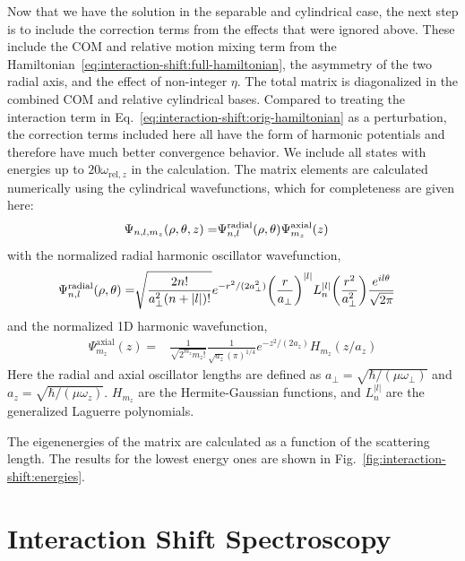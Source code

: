 Now that we have the solution in the separable and cylindrical case,
the next step is to include the correction terms from the effects that were ignored above.
These include the COM and relative motion mixing term
from the Hamiltonian~\ref{eq:interaction-shift:full-hamiltonian},
the asymmetry of the two radial axis, and the effect of non-integer $\eta$.
The total matrix is diagonalized in the combined COM and relative cylindrical bases.
Compared to treating the interaction term in Eq.~\ref{eq:interaction-shift:orig-hamiltonian}
as a perturbation, the correction terms included here all have the form of
harmonic potentials and therefore have much better convergence behavior.
We include all states with energies up to $20 \omega_{\mathrm{rel},z}$ in the calculation.
The matrix elements are calculated numerically using the cylindrical wavefunctions,
which for completeness are given here:
\begin{align*}
  \Psi_{n,l,m_z}{\left({\rho,\theta,z}\right)}=
  &\Psi^{\mathrm{radial}}_{n,l}{\left({\rho, \theta}\right)}\Psi^{\mathrm{axial}}_{m_z}{\left({z}\right)}
\end{align*}
with the normalized radial harmonic oscillator wavefunction,
\begin{align*}
  \Psi^{\mathrm{radial}}_{n,l}{\left({\rho, \theta}\right)}=
  &\sqrt{\frac{2n!}{a_\perp^2 (n+|l|)!}} e^{-r^2/(2 a_\perp^2)} {\left({\frac{r}{a_\perp}}\right)}^{|l|}
    L_n^{|l|}{\left({\frac{r^2}{a_\perp^2}}\right)} \frac{ e^{i l \theta}}{\sqrt{2 \pi}}
\end{align*}
and the normalized 1D harmonic wavefunction,
\begin{align*}
  \Psi^{\mathrm{axial}}_{m_z}(z)=&\frac{1}{\sqrt{2^{m_z} m_z!}} \frac{1}{\sqrt{a_z}(\pi)^{1/4}}
                                   e^{-z^2/(2 a_z)} H_{m_z}(z/a_z)
\end{align*}
Here the radial and axial oscillator lengths are defined as
$a_\perp = \sqrt{\hbar/(\mu \omega_\perp)}$ and $a_z = \sqrt{\hbar/ (\mu \omega_z)}$.
$H_{m_z}$ are the Hermite-Gaussian functions,
and $L^{|l|}_n$ are the generalized Laguerre polynomials.

The eigenenergies of the matrix are calculated as a function of the scattering length.
The results for the lowest energy ones are shown in Fig.~\ref{fig:interaction-shift:energies}.

\section{Interaction Shift Spectroscopy}
\label{ch:interaction-shift:spectroscopy}

